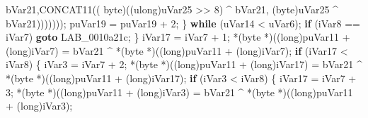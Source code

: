 \documentclass[
]{article}
\newenvironment{Shaded}{}{}
\newcommand{\ControlFlowTok}[1]{\textcolor[rgb]{0.00,0.44,0.13}{\textbf{#1}}}
\newcommand{\DataTypeTok}[1]{\textcolor[rgb]{0.56,0.13,0.00}{#1}}
\newcommand{\DecValTok}[1]{\textcolor[rgb]{0.25,0.63,0.44}{#1}}
\newcommand{\ExtensionTok}[1]{#1}
\newcommand{\NormalTok}[1]{#1}
\newcommand{\OperatorTok}[1]{\textcolor[rgb]{0.40,0.40,0.40}{#1}}
\begin{document}
\begin{Shaded}
\begin{Highlighting}[]
\NormalTok{                                                                                bVar21}\OperatorTok{,}\NormalTok{CONCAT11}\OperatorTok{((}
\NormalTok{                                                  byte}\OperatorTok{)((}\ExtensionTok{ulong}\OperatorTok{)}\NormalTok{uVar25 }\OperatorTok{\textgreater{}\textgreater{}} \DecValTok{8}\OperatorTok{)} \OperatorTok{\^{}}\NormalTok{ bVar21}\OperatorTok{,}
                                                  \OperatorTok{(}\NormalTok{byte}\OperatorTok{)}\NormalTok{uVar25 }\OperatorTok{\^{}}\NormalTok{ bVar21}\OperatorTok{)))))));}
\NormalTok{        puVar19 }\OperatorTok{=}\NormalTok{ puVar19 }\OperatorTok{+} \DecValTok{2}\OperatorTok{;}
      \OperatorTok{\}} \ControlFlowTok{while} \OperatorTok{(}\NormalTok{uVar14 }\OperatorTok{\textless{}}\NormalTok{ uVar6}\OperatorTok{);}
      \ControlFlowTok{if} \OperatorTok{(}\NormalTok{iVar8 }\OperatorTok{==}\NormalTok{ iVar7}\OperatorTok{)} \ControlFlowTok{goto}\NormalTok{ LAB\_0010a21c}\OperatorTok{;}
    \OperatorTok{\}}
\NormalTok{    iVar17 }\OperatorTok{=}\NormalTok{ iVar7 }\OperatorTok{+} \DecValTok{1}\OperatorTok{;}
    \OperatorTok{*(}\NormalTok{byte }\OperatorTok{*)((}\DataTypeTok{long}\OperatorTok{)}\NormalTok{puVar11 }\OperatorTok{+} \OperatorTok{(}\DataTypeTok{long}\OperatorTok{)}\NormalTok{iVar7}\OperatorTok{)} \OperatorTok{=}\NormalTok{ bVar21 }\OperatorTok{\^{}} \OperatorTok{*(}\NormalTok{byte }\OperatorTok{*)((}\DataTypeTok{long}\OperatorTok{)}\NormalTok{puVar11 }\OperatorTok{+} \OperatorTok{(}\DataTypeTok{long}\OperatorTok{)}\NormalTok{iVar7}\OperatorTok{);}
    \ControlFlowTok{if} \OperatorTok{(}\NormalTok{iVar17 }\OperatorTok{\textless{}}\NormalTok{ iVar8}\OperatorTok{)} \OperatorTok{\{}
\NormalTok{      iVar3 }\OperatorTok{=}\NormalTok{ iVar7 }\OperatorTok{+} \DecValTok{2}\OperatorTok{;}
      \OperatorTok{*(}\NormalTok{byte }\OperatorTok{*)((}\DataTypeTok{long}\OperatorTok{)}\NormalTok{puVar11 }\OperatorTok{+} \OperatorTok{(}\DataTypeTok{long}\OperatorTok{)}\NormalTok{iVar17}\OperatorTok{)} \OperatorTok{=}\NormalTok{ bVar21 }\OperatorTok{\^{}} \OperatorTok{*(}\NormalTok{byte }\OperatorTok{*)((}\DataTypeTok{long}\OperatorTok{)}\NormalTok{puVar11 }\OperatorTok{+} \OperatorTok{(}\DataTypeTok{long}\OperatorTok{)}\NormalTok{iVar17}\OperatorTok{);}
      \ControlFlowTok{if} \OperatorTok{(}\NormalTok{iVar3 }\OperatorTok{\textless{}}\NormalTok{ iVar8}\OperatorTok{)} \OperatorTok{\{}
\NormalTok{        iVar17 }\OperatorTok{=}\NormalTok{ iVar7 }\OperatorTok{+} \DecValTok{3}\OperatorTok{;}
        \OperatorTok{*(}\NormalTok{byte }\OperatorTok{*)((}\DataTypeTok{long}\OperatorTok{)}\NormalTok{puVar11 }\OperatorTok{+} \OperatorTok{(}\DataTypeTok{long}\OperatorTok{)}\NormalTok{iVar3}\OperatorTok{)} \OperatorTok{=}\NormalTok{ bVar21 }\OperatorTok{\^{}} \OperatorTok{*(}\NormalTok{byte }\OperatorTok{*)((}\DataTypeTok{long}\OperatorTok{)}\NormalTok{puVar11 }\OperatorTok{+} \OperatorTok{(}\DataTypeTok{long}\OperatorTok{)}\NormalTok{iVar3}\OperatorTok{);}

\end{Highlighting}
\end{Shaded}
\end{document}
